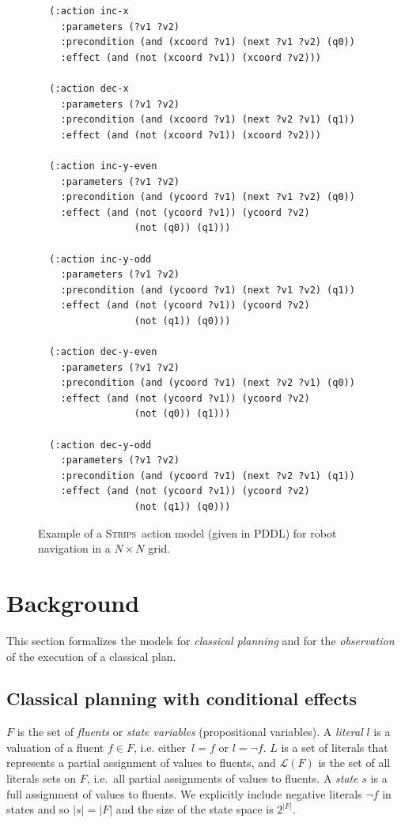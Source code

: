\documentclass[letterpaper]{article} %
\newcommand{\strips}{\textsc{Strips}}     %
\begin{document}
\begin{figure}
  \begin{tiny}
  \begin{verbatim}
  (:action inc-x
    :parameters (?v1 ?v2)
    :precondition (and (xcoord ?v1) (next ?v1 ?v2) (q0))
    :effect (and (not (xcoord ?v1)) (xcoord ?v2)))

  (:action dec-x
    :parameters (?v1 ?v2)
    :precondition (and (xcoord ?v1) (next ?v2 ?v1) (q1))
    :effect (and (not (xcoord ?v1)) (xcoord ?v2)))

  (:action inc-y-even
    :parameters (?v1 ?v2)
    :precondition (and (ycoord ?v1) (next ?v1 ?v2) (q0))
    :effect (and (not (ycoord ?v1)) (ycoord ?v2)
                 (not (q0)) (q1)))

  (:action inc-y-odd
    :parameters (?v1 ?v2)
    :precondition (and (ycoord ?v1) (next ?v1 ?v2) (q1))
    :effect (and (not (ycoord ?v1)) (ycoord ?v2)
                 (not (q1)) (q0)))

  (:action dec-y-even
    :parameters (?v1 ?v2)
    :precondition (and (ycoord ?v1) (next ?v2 ?v1) (q0))
    :effect (and (not (ycoord ?v1)) (ycoord ?v2)
                 (not (q0)) (q1)))

  (:action dec-y-odd
    :parameters (?v1 ?v2)
    :precondition (and (ycoord ?v1) (next ?v2 ?v1) (q1))
    :effect (and (not (ycoord ?v1)) (ycoord ?v2)
                 (not (q1)) (q0)))
  \end{verbatim}
  \end{tiny}
 \caption{\small Example of a \strips\ action model (given in PDDL) for robot navigation in a $N\times N$ grid.}
\label{fig:model-example}
\end{figure}



\section{Background}
\label{sec:background}
This section formalizes the models for {\em classical planning} and for the {\em observation} of the execution of a classical plan.

\subsection{Classical planning with conditional effects}
$F$ is the set of {\em fluents} or {\em state variables} (propositional variables). A {\em literal} $l$ is a valuation of a fluent $f\in F$, i.e. either~$l=f$ or $l=\neg f$. $L$ is a set of literals that represents a partial assignment of values to fluents, and $\mathcal{L}(F)$ is the set of all literals sets on $F$, i.e.~all partial assignments of values to fluents. A {\em state} $s$ is a full assignment of values to fluents. We explicitly include negative literals $\neg f$ in states and so $|s|=|F|$ and the size of the state space is $2^{|F|}$.
\end{document}
